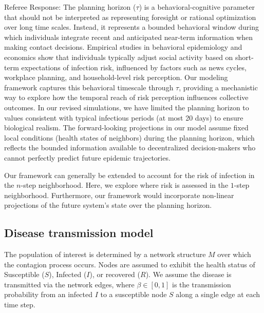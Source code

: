 \documentclass[9pt,twocolumn,twoside]{pnas-new}
\newcommand{\green}[1]{{\textcolor{green!50!black}{#1}}}
\begin{document}
\green{Referee Response: The planning horizon ($\tau$) is a behavioral-cognitive parameter that should not be interpreted as representing foresight or rational optimization over long time scales. Instead, it represents a bounded behavioral window during which individuals integrate recent and anticipated near-term information when making contact decisions. Empirical studies in behavioral epidemiology and economics show that individuals typically adjust social activity based on short-term expectations of infection risk, influenced by factors such as news cycles, workplace planning, and household-level risk perception. Our modeling framework captures this behavioral timescale through $\tau$, providing a mechanistic way to explore how the temporal reach of risk perception influences collective outcomes. In our revised simulations, we have limited the planning horizon to values consistent with typical infectious periods (at most 20 days) to ensure biological realism. The forward-looking projections in our model assume fixed local conditions (health states of neighbors) during the planning horizon, which reflects the bounded information available to decentralized decision-makers who cannot perfectly predict future epidemic trajectories.}

Our framework can generally be extended to account for the risk of infection in the $ n$-step neighborhood. Here, we explore where risk is assessed in the $1$-step neighborhood. Furthermore, our framework would incorporate non-linear projections of the future system's state over the planning horizon.

\subsection*{Disease transmission model}

The population of interest is determined by a network structure $M$ over which the contagion process occurs. Nodes are assumed to exhibit the health status of Susceptible ($S$), Infected ($I$), or recovered ($R$). We assume the disease is transmitted via the network edges, where $\beta\in [0,1]$ is the transmission probability from an infected $I$ to a susceptible node $S$ along a single edge at each time step.

\end{document}
